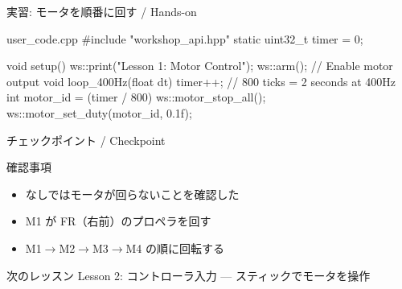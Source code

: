 \begin{frame}[fragile]{実習: モータを順番に回す / Hands-on}
  \begin{sflisting}{user\_code.cpp}
#include "workshop_api.hpp"
static uint32_t timer = 0;

void setup() {
    ws::print("Lesson 1: Motor Control");
    ws::arm();  // Enable motor output
}
void loop_400Hz(float dt) {
    timer++;
    // 800 ticks = 2 seconds at 400Hz
    int motor_id = (timer / 800) %
    ws::motor_stop_all();
    ws::motor_set_duty(motor_id, 0.1f);
}
  \end{sflisting}
\end{frame}

\begin{frame}{チェックポイント / Checkpoint}
  \begin{alertblock}{確認事項}
    \begin{itemize}
      \item[$\square$]  なしではモータが回らないことを確認した
      \item[$\square$] M1 が FR（右前）のプロペラを回す
      \item[$\square$] M1$\to$M2$\to$M3$\to$M4 の順に回転する
    \end{itemize}
  \end{alertblock}

  \vspace{1em}

  \begin{block}{次のレッスン}
    Lesson 2: コントローラ入力 --- スティックでモータを操作
  \end{block}
\end{frame}
